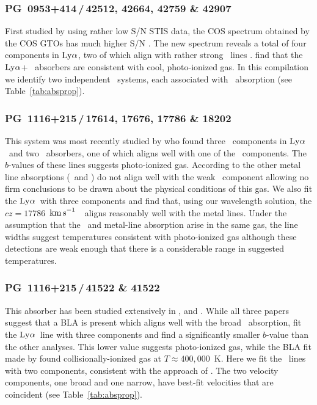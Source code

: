 \documentclass[twocolumn,twocolappendix,tighten,times]{aastex6}
\newcommand{\HI}{\ion{H}{1}}
\newcommand{\CIV}{\ion{C}{4}}
\newcommand{\OVI}{\ion{O}{6}}
\newcommand{\kms}{\ensuremath{{\rm km\,s}^{-1}}}
\newcommand{\lya}{\ensuremath{{\rm Ly}\alpha}}
\begin{document}
\subsubsection{PG~0953+414\,/\,42512, 42664, 42759 \& 42907}
\label{indiv:absorbers:pg0953_42664}

First studied by \citet{savage02} using rather low S/N STIS data, the
COS spectrum obtained by the COS GTOs has much higher S/N
\citep{savage14}. The new spectrum reveals a total of four components
in \lya, two of which align with rather strong \OVI\ lines \citep[see
Figure~1 in][]{savage14}. \citet{savage14} find that the \lya + \OVI\
absorbers are consistent with cool, photo-ionized gas. In this
compilation we identify two independent \HI\ systems, each associated
with \OVI\ absorption (see Table~\ref{tab:absprop}).


\subsubsection{PG~1116+215\,/\,17614, 17676, 17786 \& 18202}
\label{indiv:absorbers:pg1116_17676}

This system was most recently studied by \citet{savage14} who found
three \HI\ components in \lya\ and two \OVI\ absorbers, one of which
aligns well with one of the \HI\ components. The $b$-values of these
lines suggests photo-ionized gas. According to \citet{savage14} the
other metal line absorptions (\CIV\ and \OVI) do not align well with
the weak \HI\ component allowing no firm conclusions to be drawn about
the physical conditions of this gas. We also fit the \lya\ with three
components and find that, using our wavelength solution, the
$cz=17786$~\kms\ \HI\ aligns reasonably well with the metal
lines. Under the assumption that the \HI\ and metal-line absorption
arise in the same gas, the line widths suggest temperatures consistent
with photo-ionized gas although these detections are weak enough that
there is a considerable range in suggested temperatures.  


\subsubsection{PG~1116+215\,/\,41522 \& 41522}
\label{indiv:absorbers:pg1116_41522}

This absorber has been studied extensively in \citet{danforth10},
\citet{savage14} and \citet{stocke14}. While all three papers suggest
that a BLA is present which aligns well with the broad
\OVI\ absorption, \citet{savage14} fit the \lya\ line with three
components and find a significantly smaller $b$-value than the other
analyses. This lower value suggests photo-ionized gas, while the BLA
fit made by \citet{stocke14} found collisionally-ionized gas at
$T\approx400,000$~K. Here we fit the \HI\ lines with two components, 
consistent with the approach of \citet{stocke14}. The two velocity 
components, one broad and one narrow, have best-fit velocities that 
are coincident (see Table~\ref{tab:absprop}).
\end{document}
